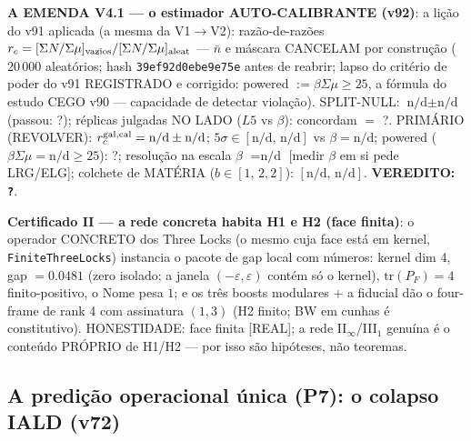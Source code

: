 \documentclass[11pt]{article}
\theoremstyle{definition}\newtheorem{deriv}{Derivação}
\begin{document}
\textbf{A EMENDA V4.1 --- o estimador AUTO-CALIBRANTE (v92)}: a lição do v91 aplicada (a mesma da V1$\to$V2): razão-de-razões $r_c=[\Sigma N/\Sigma\mu]_{\rm vazios}/[\Sigma N/\Sigma\mu]_{\rm aleat}$ --- $\bar n$ e máscara CANCELAM por construção ($20\,000$ aleatórios; hash \texttt{39ef92d0ebe9e75e} antes de reabrir; lapso do critério de poder do v91 REGISTRADO e corrigido: powered $:=\beta\Sigma\mu\ge25$, a fórmula do estudo CEGO v90 --- capacidade de detectar violação). SPLIT-NULL: $\text{n/d}\pm\text{n/d}$ (passou: ?); réplicas julgadas NO LADO ($L5$ vs $\beta$): concordam $=$ ?. PRIMÁRIO (REVOLVER): $r_c^{\rm gal,cal}=\text{n/d}\pm\text{n/d}$; $5\sigma\in[\text{n/d},\,\text{n/d}]$ vs $\beta=\text{n/d}$; powered ($\beta\Sigma\mu=\text{n/d}\ge25$): ?; resolução na escala $\beta$ $=\text{n/d}$ [medir $\beta$ em si pede LRG/ELG]; colchete de MATÉRIA ($b\in[1,\,2{,}2]$): $[\text{n/d},\,\text{n/d}]$. \textbf{VEREDITO: \texttt{?}}.

\textbf{Certificado II --- a rede concreta habita H1 e H2 (face finita)}: o operador CONCRETO dos Three Locks (o mesmo cuja face está em kernel, \texttt{FiniteThreeLocks}) instancia o pacote de gap local com números: kernel dim 4, gap $=0.0481$ (zero isolado; a janela $(-\varepsilon,\varepsilon)$ contém só o kernel), $\mathrm{tr}(P_F)=4$ finito-positivo, o Nome pesa $1$; e os três boosts modulares $+$ a fiducial dão o four-frame de rank 4 com assinatura $(1,3)$ (H2 finito; BW em cunhas é constitutivo). HONESTIDADE: face finita [REAL]; a rede II$_\infty$/III$_1$ genuína é o conteúdo PRÓPRIO de H1/H2 --- por isso são hipóteses, não teoremas.

\subsection*{A predição operacional única (P7): o colapso IALD (v72)}
\end{document}
